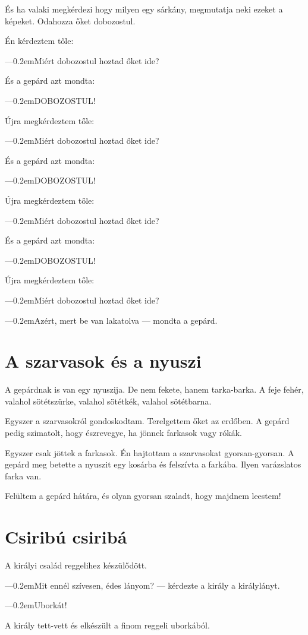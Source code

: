 \documentclass[12pt]{memoir}
\def\dash{---\kern 0.2em}
\begin{document}
És ha valaki megkérdezi hogy milyen egy sárkány, megmutatja neki ezeket a
képeket. Odahozza őket dobozostul.

Én kérdeztem tőle:

\dash Miért dobozostul hoztad őket ide?

És a gepárd azt mondta:

\dash DOBOZOSTUL!

Újra megkérdeztem tőle:

\dash Miért dobozostul hoztad őket ide?

És a gepárd azt mondta:

\dash DOBOZOSTUL!

Újra megkérdeztem tőle:

\dash Miért dobozostul hoztad őket ide?

És a gepárd azt mondta:

\dash DOBOZOSTUL!

Újra megkérdeztem tőle:

\dash Miért dobozostul hoztad őket ide?

\dash Azért, mert be van lakatolva — mondta a gepárd.


\section{A szarvasok és a nyuszi}
A gepárdnak is van egy nyuszija. De nem fekete, hanem tarka-barka. A feje
fehér, valahol sötétszürke, valahol sötétkék, valahol sötétbarna.

Egyszer a szarvasokról gondoskodtam. Terelgettem őket az erdőben. A gepárd
pedig szimatolt, hogy észrevegye, ha jönnek farkasok vagy rókák.

Egyszer csak jöttek a farkasok. Én hajtottam a szarvasokat gyorsan-gyorsan. A
gepárd meg betette a nyuszit egy kosárba és felszívta a farkába. Ilyen
varázslatos farka van.

Felültem a gepárd hátára, és olyan gyorsan szaladt, hogy majdnem leestem!


\section{Csiribú csiribá}
A királyi család reggelihez készülődött.

\dash Mit ennél szívesen, édes lányom? — kérdezte a király a királylányt.

\dash Uborkát!

A király tett-vett és elkészült a finom reggeli uborkából.
\end{document}
